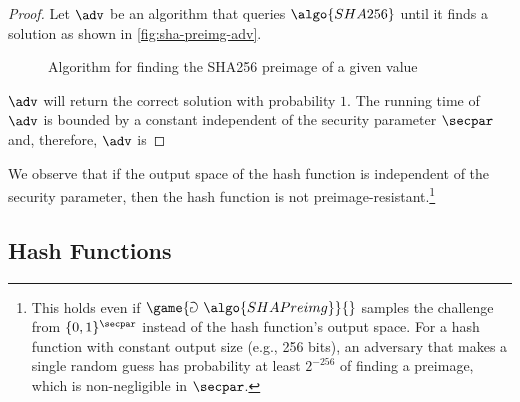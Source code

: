 \begin{proof}
  Let $\adv$ be an algorithm that queries $\algo{SHA256}$ until it finds a solution as shown in \autoref{fig:sha-preimg-adv}.
  \begin{figure}[tbhp]
  \begin{center}
    \begin{tcolorbox}[width=5cm]
      \begin{pchstack}[center]
      \end{pchstack}
    \end{tcolorbox}
  \end{center}
  \caption{Algorithm for finding the SHA256 preimage of a given value \label{fig:sha-preimg-adv}}
  \end{figure}
  $\adv$ will return the correct solution with probability $1$.
  The running time of $\adv$ is bounded by a constant independent of the security parameter $\secpar$ and, therefore, $\adv$ is \ppt
\end{proof}


We observe that if the output space of the hash function is independent of the security parameter, then the hash function is not preimage-resistant.\footnote{This holds even if $\game{\Game~\algo{SHAPreimg}}{}$ samples the challenge from $\{0,1\}^\secpar$ instead of the hash function's output space.
For a hash function with constant output size (e.g., 256 bits), an adversary that makes a single random guess has probability at least $2^{-256}$ of finding a preimage, which is non-negligible in $\secpar$.}

\subsection{Hash Functions}

